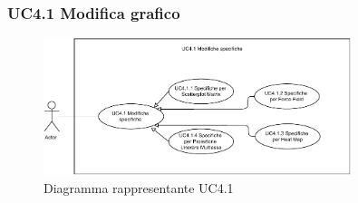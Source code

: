 \newpage
\subsubsection{UC4.1 Modifica grafico}
\label{ssub:uc4.1}

\begin{figure}[h]
    \centering
    \includegraphics[width=0.8\textwidth]{componenti/casi-duso/diagrammi/UC4_1.pdf}
    \caption{Diagramma rappresentante UC4.1}
    \label{fig:UC4}
\end{figure}

